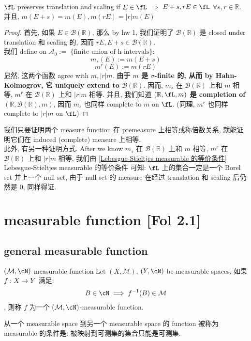 \documentclass[lang=cn,11pt]{elegantbook}
\begin{document}
\begin{theorem}{$\fL$ preserves translation and scaling}
    if $E \in \fL$ $\Longrightarrow$ $E+s, rE \in \fL$ $\forall s,r \in \mathbb{R}$.\\
    并且, $m(E+s) = m(E), m(rE) = |r| m(E)$
\end{theorem}
\begin{proof}
首先, 如果 $E \in \mathcal{B}(\mathbb{R})$, 那么 by hw 1, 我们证明了 $\mathcal{B}(\mathbb{R})$ 是 closed under translation 和 scaling 的, 因而 $rE, E+s \in \mathcal{B}(\mathbb{R})$.\\
我们 define on $\mathcal{A}_0:=$ $\{\text{finite union of h-intervals}\}$:
$$
m_s(E) := m(E+s)
$$
$$
m^r(E) := m(rE)
$$
显然, 这两个函数 agree with $m, |r|m$. \textbf{由于 $m$ 是 $\sigma$-finite 的, 从而 by Hahn-Kolmogrov, 它 uniquely extend to $\mathcal{B}(\mathbb{R})$}. 因而, $m_s$ 在 $\mathcal{B}(\mathbb{R})$ 上和 $m$ 相等, $m^r$ 在 $\mathcal{B}(\mathbb{R})$ 上和 $|r|m$ 相等. 并且, 我们知道\textbf{ $(\mathbb{R}, \fL, m)$ 是 completion of $(\mathbb{R}, \mathcal{B}(\mathbb{R}),m)$}, 因而 $m_s$ 也同样 complete to $m$ on $\fL$. (同理, $m^r$ 也同样 complete to $|r|m$ on $\fL$)
\end{proof}
\begin{remark}
    我们只要证明两个 measure function 在 premeasure 上相等或称倍数关系, 就能证明它们在 induced (complete) measure 上相等.\\
此外, 有另一种证明方式. After we know $m_s$ 在 $\mathcal{B}(\mathbb{R})$ 上和 $m$ 相等, $m^r$ 在 $\mathcal{B}(\mathbb{R})$ 上和 $|r|m$ 相等, 我们由 \ref{Lebesgue-Stieltjes measurable 的等价条件} Lebesgue-Stieltjes measurable 的等价条件 可知: $\fL$ 上的集合一定是一个 Borel set 并上一个 null set, 由于 null set 的 measure 在经过 translation 和 scaling 后仍然是 0, 同样得证.
 \end{remark}









\chapter{measurable function [Fol 2.1]}
\section{general measurable function}
\begin{definition}{$(\mathcal{M}, \cN)$-measurable function}
Let $(X,\mathcal{M})$, $(Y,\cN)$ be measurable spaces, 如果 $f: X \rightarrow Y$ 满足: $$B \in \cN \implies f^{-1}(B) \in \mathcal{M}$$, 则称 $f$ 为一个 $(\mathcal{M}, \cN)$-measurable function.
\end{definition}
从一个 measurable space 到另一个 measurable space 的 function 被称为 measurable 的条件是: 被映射到可测集的集合只能是可测集.
\end{document}
